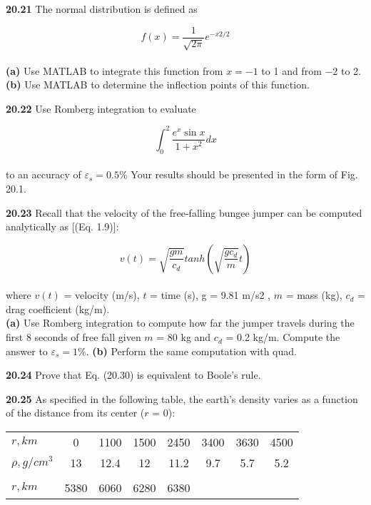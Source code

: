 \documentclass[../main.tex]{subfiles}
\begin{document}
\begin{multicols}{2}
\textbf{20.21} The normal distribution is defined as

	$$f(x) = \dfrac{1}{\sqrt{2 \pi}} e^{-x2/2}$$\\
\textbf{(a)} Use MATLAB to integrate this function from $x = −1$ to
1 and from −2 to 2.\\
\textbf{(b)} Use MATLAB to determine the inflection points of this
function.

\textbf{20.22} Use Romberg integration to evaluate

	$$\int^{2}_{0} \dfrac{e^{x} \sin x}{1+x^{2}} dx$$\\
to an accuracy of $\varepsilon_{s} = 0.5\%$ Your results should be presented in the form of Fig. 20.1.

\textbf{20.23} Recall that the velocity of the free-falling bungee
jumper can be computed analytically as [(Eq. 1.9)]:

	$$v(t) = \sqrt{\dfrac{gm}{c_{d}}} tanh \left( \sqrt{\dfrac{gc_{d}}{m}} t \right)$$\\
where $v(t)$ = velocity (m/s), $t$ = time (s), g = 9.81 m/s2
, 
$m$ = mass (kg), $c_{d}$ = drag coefficient (kg/m). \\
\textbf{(a)} Use Romberg integration to compute how far the jumper
travels during the first 8 seconds of free fall given $m$ =
80 kg and $c_{d}$ = 0.2 kg/m. Compute the answer to $\varepsilon_{s} = 1\%$.
\textbf{(b)} Perform the same computation with quad.

\textbf{20.24} Prove that Eq. (20.30) is equivalent to Boole's rule.

\textbf{20.25} As specified in the following table, the earth's density
varies as a function of the distance from its center ($r$ = 0):\\
\begin{tabular}{lccccccc}
	\hline

\scriptsize{\textbf{$r, km$}} & \scriptsize{0} & \scriptsize{1100} & \scriptsize{1500} & \scriptsize{2450} & \scriptsize{3400} & \scriptsize{3630} & \scriptsize{4500}\\

\scriptsize{\textbf{$\rho, g/cm^{3}$}} & \scriptsize{13} & \scriptsize{12.4} & \scriptsize{12} & \scriptsize{11.2} & \scriptsize{9.7} & \scriptsize{5.7} & \scriptsize{5.2}\\

\vspace{0in}\\

\scriptsize{\textbf{$r,km$}} & \scriptsize{5380} & \scriptsize{6060} & \scriptsize{6280} & \scriptsize{6380} & \vspace{0in} & \vspace{0in} & \vspace{0in}\\


\end{tabular}
\end{multicols}
\end{document}
